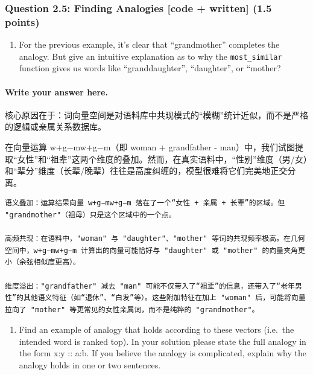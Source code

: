 \documentclass[11pt]{article}
\providecommand{\tightlist}{%
      \setlength{\itemsep}{0pt}\setlength{\parskip}{0pt}}
\begin{document}
    \subsubsection{Question 2.5: Finding Analogies {[}code + written{]} (1.5
points)}\label{question-2.5-finding-analogies-code-written-1.5-points}

\begin{enumerate}
\def\labelenumi{\alph{enumi}.}
\tightlist
\item
  For the previous example, it's clear that ``grandmother'' completes
  the analogy. But give an intuitive explanation as to why the
  \texttt{most\_similar} function gives us words like ``granddaughter'',
  ``daughter'', or ``mother?
\end{enumerate}

    \paragraph{Write your answer here.}\label{write-your-answer-here.}

核心原因在于：词向量空间是对语料库中共现模式的``模糊''统计近似，而不是严格的逻辑或亲属关系数据库。

在向量运算 w+g−mw+g−m（即 woman + grandfather -
man）中，我们试图提取``女性''和``祖辈''这两个维度的叠加。然而，在真实语料中，``性别''维度（男/女）和``辈分''维度（长辈/晚辈）往往是高度纠缠的，模型很难将它们完美地正交分离。

\begin{verbatim}
语义叠加：运算结果向量 w+g−mw+g−m 落在了一个“女性 + 亲属 + 长辈”的区域。但 "grandmother"（祖母）只是这个区域中的一个点。

高频共现：在语料中，"woman" 与 "daughter"、"mother" 等词的共现频率极高。在几何空间中，w+g−mw+g−m 计算出的向量可能恰好与 "daughter" 或 "mother" 的向量夹角更小（余弦相似度更高）。

维度溢出："grandfather" 减去 "man" 可能不仅带入了“祖辈”的信息，还带入了“老年男性”的其他语义特征（如“退休”、“白发”等）。这些附加特征在加上 "woman" 后，可能将向量拉向了 "mother" 等更常见的女性亲属词，而不是纯粹的 "grandmother"。
\end{verbatim}

    \begin{enumerate}
\def\labelenumi{\alph{enumi}.}
\setcounter{enumi}{1}
\tightlist
\item
  Find an example of analogy that holds according to these vectors
  (i.e.~the intended word is ranked top). In your solution please state
  the full analogy in the form x:y :: a:b. If you believe the analogy is
  complicated, explain why the analogy holds in one or two sentences.
\end{enumerate}
\end{document}
